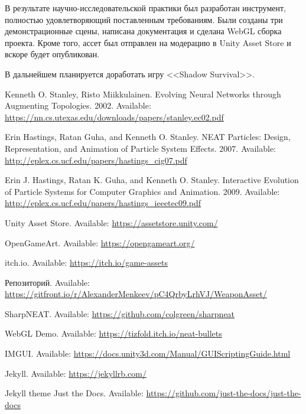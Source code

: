 ﻿

В результате научно-исследовательской практики был разработан инструмент, полностью удовлетворяющий поставленным требованиям. Были созданы три демонстрационные сцены, написана документация и сделана WebGL сборка проекта. Кроме того, ассет был отправлен на модерацию в Unity Asset Store и вскоре будет опубликован.

В дальнейшем планируется доработать игру <<Shadow Survival>>.

\pagebreak

\begin{thebibliography}{1}

     Kenneth O. Stanley, Risto Miikkulainen. \flqq Evolving Neural Networks through Augmenting Topologies\frqq. 2002. Available: \url{https://nn.cs.utexas.edu/downloads/papers/stanley.ec02.pdf}

     Erin Hastings, Ratan Guha, and Kenneth O. Stanley. \flqq NEAT Particles: Design, Representation, and Animation of Particle System Effects\frqq. 2007. Available: \url{http://eplex.cs.ucf.edu/papers/hastings_cig07.pdf}

     Erin J. Hastings, Ratan K. Guha, and Kenneth O. Stanley. \flqq Interactive Evolution of Particle Systems for Computer Graphics and Animation\frqq. 2009. Available: \url{http://eplex.cs.ucf.edu/papers/hastings_ieeetec09.pdf}

     Unity Asset Store. Available: \url{https://assetstore.unity.com/}

     OpenGameArt. Available: \url{https://opengameart.org/}

     itch.io. Available: \url{https://itch.io/game-assets}

     Репозиторий. Available: \url{https://gitfront.io/r/AlexanderMenkeev/pC4QrbyLrhVJ/WeaponAsset/}

     SharpNEAT. Available: \url{https://github.com/colgreen/sharpneat}

     WebGL Demo. Available: \url{https://tizfold.itch.io/neat-bullets}

     IMGUI. Available: \url{https://docs.unity3d.com/Manual/GUIScriptingGuide.html}

     Jekyll. Available: \url{https://jekyllrb.com/}

     Jekyll theme Just the Docs. Available: \url{https://github.com/just-the-docs/just-the-docs}


\end{thebibliography}

